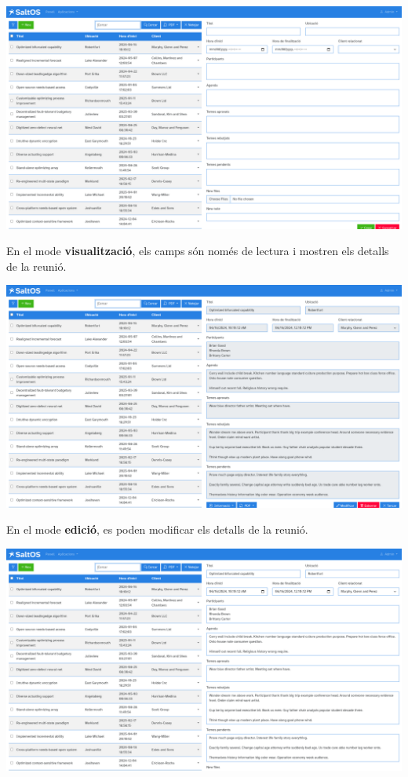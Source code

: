 \documentclass[a4paper]{article}
\begin{document}
\begin{center}\includegraphics[width=1\textwidth]{../ujest/snaps/test-screenshots-js-screenshots-crm-meetings-create-ca-es-1-snap.png}\end{center}

En el mode \textbf{visualització}, els camps són només de lectura i mostren els detalls de la reunió.

\begin{center}\includegraphics[width=1\textwidth]{../ujest/snaps/test-screenshots-js-screenshots-crm-meetings-view-100-ca-es-1-snap.png}\end{center}

En el mode \textbf{edició}, es poden modificar els detalls de la reunió.

\begin{center}\includegraphics[width=1\textwidth]{../ujest/snaps/test-screenshots-js-screenshots-crm-meetings-edit-100-ca-es-1-snap.png}\end{center}
\end{document}
